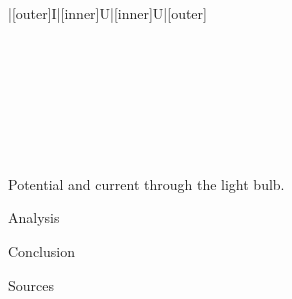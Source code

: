 \begin{paper}
{\begin{papertable}{|[outer]I|[inner]U|[inner]U|[outer]}
			\papertableindex{}\\\paperiline
			\papertableindex{}\\\paperiline
			\papertableindex{}\\\paperiline
			\papertableindex{}\\\paperiline
			\papertableindex{}\\\paperiline
			\papertableindex{}\\\paperiline
			\papertableindex{}\\\paperiline
			\papertableindex{}\\\paperoline
			\end{papertable}\vspace{-1.5em}}
	{Potential and current through the light bulb.}\vspace{1em}


	Analysis


	Conclusion


	Sources

\papersource{}

\end{paper}

